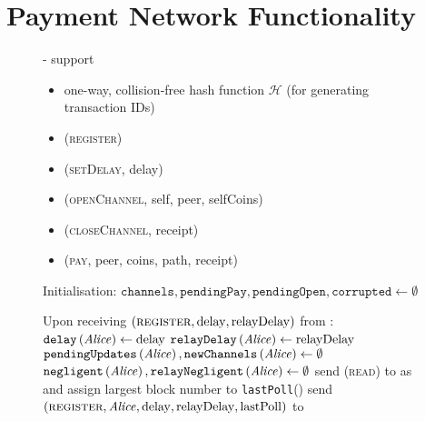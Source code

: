 \section{Payment Network Functionality}
  \begin{figure}[H]
    \begin{systembox}{\fpaynet - support}
        \begin{itemize}
          \item one-way, collision-free hash function $\mathcal{H}$ (for
          generating transaction IDs)
        \end{itemize}

        \begin{itemize}
          \item (\textsc{register})
          \item (\textsc{setDelay}, delay)
          \item (\textsc{openChannel}, self, peer, selfCoins)
          \item (\textsc{closeChannel}, receipt)
          \item (\textsc{pay}, peer, coins, path, receipt)
        \end{itemize}

      \begin{algorithmic}[1]
        \State Initialisation:
        \Indent
          \State $\mathtt{channels}, \mathtt{pendingPay}, \mathtt{pendingOpen},
          \mathtt{corrupted} \gets \emptyset$
        \EndIndent
        \Statex

        \State Upon receiving $\left(\textsc{register}, \mathrm{delay},
        \mathrm{relayDelay}\right)$ from \alice:
        \Indent
          \State $\mathtt{delay}\left(\mathit{Alice}\right) \gets \mathrm{delay}$
          \State $\mathtt{relayDelay}\left(\mathit{Alice}\right) \gets
          \mathrm{relayDelay}$
          \State $\mathtt{pendingUpdates}\left(\mathit{Alice}\right),
          \mathtt{newChannels}\left(\mathit{Alice}\right) \gets \emptyset$
          \State $\mathtt{negligent}\left(\mathit{Alice}\right),
          \mathtt{relayNegligent}\left(\mathit{Alice}\right) \gets \emptyset$
          \State send (\textsc{read}) to \ledger{} as \alice{} and assign
          largest block number to \texttt{lastPoll}(\alice)
          \label{alg:fpaynet:support:lastpoll}
          \State send $\left(\textsc{register}, \mathit{Alice}, \mathrm{delay},
          \mathrm{relayDelay}, \mathrm{lastPoll}\right)$ to \simulator
        \EndIndent
        \Statex


\end{algorithmic}
\end{systembox}
\end{figure}
